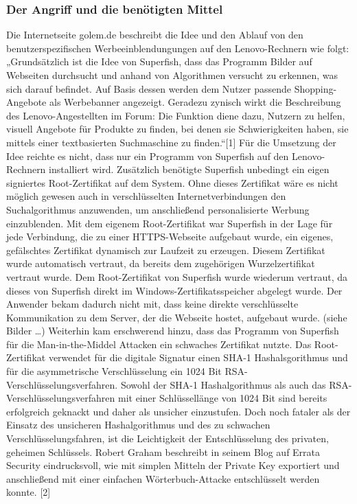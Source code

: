 \subsubsection{Der Angriff und die benötigten Mittel}
Die Internetseite golem.de beschreibt die Idee und den Ablauf von den benutzerspezifischen Werbeeinblendungungen auf den Lenovo-Rechnern wie folgt: „Grundsätzlich ist die Idee von Superfish, dass das Programm Bilder auf Webseiten durchsucht und anhand von Algorithmen versucht zu erkennen, was sich darauf befindet. Auf Basis dessen werden dem Nutzer passende Shopping-Angebote als Werbebanner angezeigt. Geradezu zynisch wirkt die Beschreibung des Lenovo-Angestellten im Forum: Die Funktion diene dazu, Nutzern zu helfen, visuell Angebote für Produkte zu finden, bei denen sie Schwierigkeiten haben, sie mittels einer textbasierten Suchmaschine zu finden.“[1]
Für die Umsetzung der Idee reichte es nicht, dass nur ein Programm von Superfish auf den Lenovo-Rechnern installiert wird. Zusätzlich benötigte Superfish unbedingt ein eigen signiertes Root-Zertifikat auf dem System. Ohne dieses Zertifikat wäre es nicht möglich gewesen auch in verschlüsselten Internetverbindungen den Suchalgorithmus anzuwenden, um anschließend personalisierte Werbung einzublenden. Mit dem eigenem Root-Zertifikat war Superfish in der Lage für jede Verbindung, die zu einer HTTPS-Webseite aufgebaut wurde, ein eigenes, gefälschtes Zertifikat dynamisch zur Laufzeit zu erzeugen. Diesem Zertifikat wurde automatisch vertraut, da bereits dem zugehörigen Wurzelzertifikat vertraut wurde. Dem Root-Zertifikat von Superfish wurde wiederum vertraut, da dieses von Superfish direkt im Windows-Zertifikatsspeicher abgelegt wurde. Der Anwender bekam dadurch nicht mit, dass keine direkte verschlüsselte Kommunikation zu dem Server, der die Webseite hostet, aufgebaut wurde. (siehe Bilder …)
Weiterhin kam erschwerend hinzu, dass das Programm von Superfish für die Man-in-the-Middel Attacken ein schwaches Zertifikat nutzte. Das Root-Zertifikat verwendet für die digitale Signatur einen SHA-1 Hashalsgorithmus und für die asymmetrische Verschlüsselung ein 1024 Bit RSA-Verschlüsselungsverfahren. Sowohl der SHA-1 Hashalgorithmus als auch das RSA-Verschlüsselungsverfahren mit einer Schlüssellänge von 1024 Bit sind bereits erfolgreich geknackt und daher als unsicher einzustufen. 
Doch noch fataler als der Einsatz des unsicheren Hashalgorithmus und des zu schwachen Verschlüsselungsfahren, ist die Leichtigkeit der Entschlüsselung des privaten, geheimen Schlüssels. Robert Graham beschreibt in seinem Blog auf Errata Security eindrucksvoll, wie mit simplen Mitteln der Private Key exportiert und anschließend mit einer einfachen Wörterbuch-Attacke entschlüsselt werden konnte. [2]
